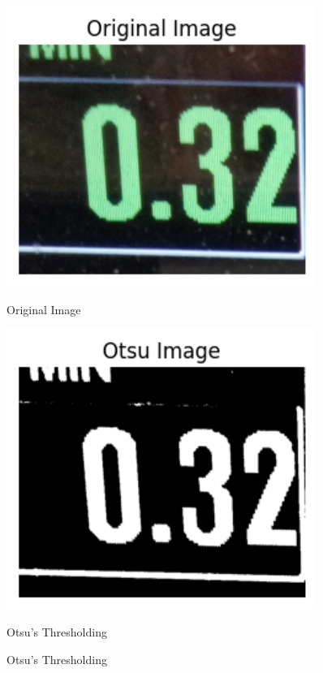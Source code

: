 \begin{figure}[h]
    \centering
    \begin{minipage}{0.45\textwidth}
        \centering
        \includegraphics[width=0.9\textwidth]{Figures/otsu/original.png}
        \caption*{Original Image}
    \end{minipage}\hfill
    \begin{minipage}{0.45\textwidth}
        \centering
        \includegraphics[width=0.9\textwidth]{Figures/otsu/otsu.png}
        \caption*{Otsu's Thresholding}
    \end{minipage}
    \caption{Otsu's Thresholding}
\end{figure}

